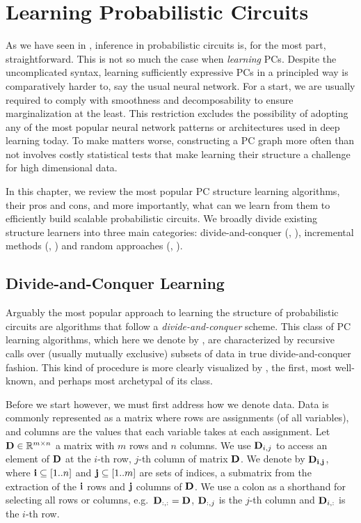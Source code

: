 \chapter{Learning Probabilistic Circuits}
\label{ch:learning}

As we have seen in , inference in probabilistic circuits is, for the most part,
straightforward.  This is not so much the case when \emph{learning} PCs. Despite the uncomplicated
syntax, learning sufficiently expressive PCs in a principled way is comparatively harder to, say
the usual neural network. For a start, we are usually required to comply with smoothness and
decomposability to ensure marginalization at the least. This restriction excludes the possibility
of adopting any of the most popular neural network patterns or architectures used in deep learning
today. To make matters worse, constructing a PC graph more often than not involves costly
statistical tests that make learning their structure a challenge for high dimensional data.

In this chapter, we review the most popular PC structure learning algorithms, their pros and cons,
and more importantly, what can we learn from them to efficiently build scalable probabilistic
circuits. We broadly divide existing structure learners into three main categories:
divide-and-conquer (\divclass{}, ), incremental methods (\incrclass{},
) and random approaches (\randclass{}, ).

\section{Divide-and-Conquer Learning}
\label{sec:divconq}

Arguably the most popular approach to learning the structure of probabilistic circuits are
algorithms that follow a \emph{divide-and-conquer} scheme. This class of PC learning algorithms,
which here we denote by \divclass{}, are characterized by recursive calls over (usually mutually
exclusive) subsets of data in true divide-and-conquer fashion. This kind of procedure is more
clearly visualized by , the first, most well-known, and perhaps most archetypal
of its class.

Before we start however, we must first address how we denote data. Data is commonly represented as
a matrix where rows are assignments (of all variables), and columns are the values that each variable
takes at each assignment. Let $\mathbf{D}\in\mathbb{R}^{m \times n}$ a matrix with $m$ rows and $n$
columns. We use $\mathbf{D}_{i,j}$ to access an element of $\mathbf{D}$ at the $i$-th row, $j$-th column
of matrix $\mathbf{D}$. We denote by $\mathbf{D}_{\mathbf{i},\mathbf{j}}$, where $\mathbf{i}\subseteq
\left[1..n\right]$ and $\mathbf{j}\subseteq\left[1..m\right]$ are sets of indices, a submatrix from
the extraction of the $\mathbf{i}$ rows and $\mathbf{j}$ columns of $\mathbf{D}$. We use a colon as a
shorthand for selecting all rows or columns, e.g.\ $\mathbf{D}_{:,:}=\mathbf{D}$, $\mathbf{D}_{:,j}$ is the
$j$-th column and $\mathbf{D}_{i,:}$ is the $i$-th row.

